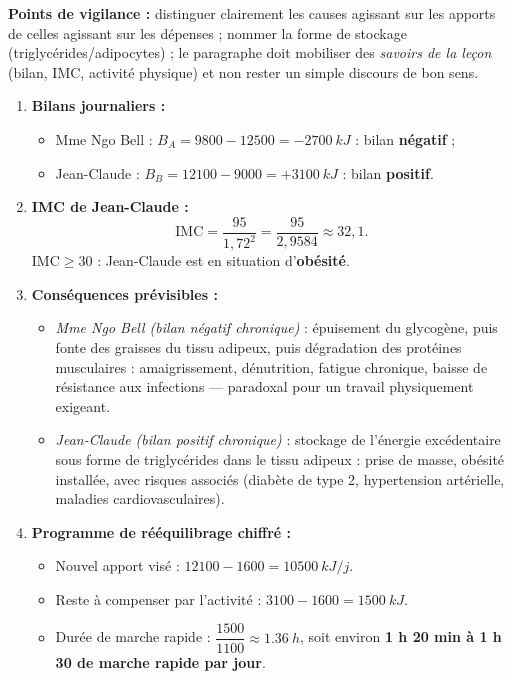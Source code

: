 \documentclass[11pt]{article}
\begin{document}
\begin{corrige}
\textbf{Points de vigilance :} distinguer clairement les causes agissant sur les apports de celles agissant sur les dépenses ; nommer la forme de stockage (triglycérides/adipocytes) ; le paragraphe doit mobiliser des \emph{savoirs de la leçon} (bilan, IMC, activité physique) et non rester un simple discours de bon sens.
\end{corrige}

\begin{corrige}
\tcblower
\begin{enumerate}
\item \textbf{Bilans journaliers :}
\begin{itemize}
\item Mme Ngo Bell : $B_A = 9800 - 12500 = -\SI{2700}{kJ}$ : bilan \textbf{négatif} ;
\item Jean-Claude : $B_B = 12100 - 9000 = +\SI{3100}{kJ}$ : bilan \textbf{positif}.
\end{itemize}
\item \textbf{IMC de Jean-Claude :}
\[ \mathrm{IMC} = \dfrac{95}{1,72^{2}} = \dfrac{95}{2,9584} \approx 32,1. \]
$\mathrm{IMC} \geq 30$ : Jean-Claude est en situation d'\textbf{obésité}.
\item \textbf{Conséquences prévisibles :}
\begin{itemize}
\item \emph{Mme Ngo Bell (bilan négatif chronique)} : épuisement du glycogène, puis fonte des graisses du tissu adipeux, puis dégradation des protéines musculaires : amaigrissement, dénutrition, fatigue chronique, baisse de résistance aux infections — paradoxal pour un travail physiquement exigeant.
\item \emph{Jean-Claude (bilan positif chronique)} : stockage de l'énergie excédentaire sous forme de triglycérides dans le tissu adipeux : prise de masse, obésité installée, avec risques associés (diabète de type 2, hypertension artérielle, maladies cardiovasculaires).
\end{itemize}
\item \textbf{Programme de rééquilibrage chiffré :}
\begin{itemize}
\item Nouvel apport visé : $12100 - 1600 = \SI{10500}{kJ/j}$.
\item Reste à compenser par l'activité : $3100 - 1600 = \SI{1500}{kJ}$.
\item Durée de marche rapide : $\dfrac{1500}{1100} \approx \SI{1,36}{h}$, soit environ \textbf{1 h 20 min à 1 h 30 de marche rapide par jour}.

\end{itemize}
\end{enumerate}
\end{corrige}
\end{document}
